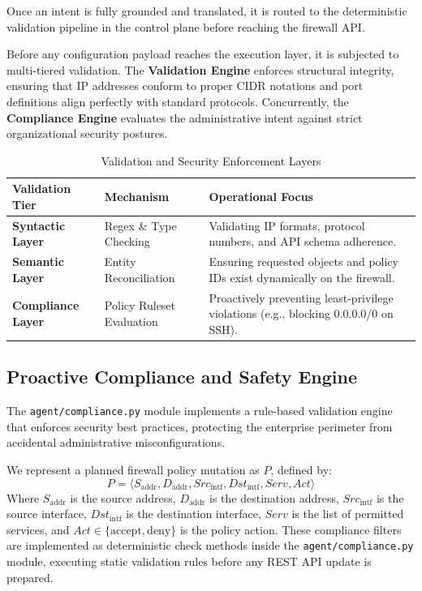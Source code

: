 Once an intent is fully grounded and translated, it is routed to the deterministic validation pipeline in the control plane before reaching the firewall API.

Before any configuration payload reaches the execution layer, it is subjected to multi-tiered validation. The \textbf{Validation Engine} enforces structural integrity, ensuring that IP addresses conform to proper CIDR notations and port definitions align perfectly with standard protocols. Concurrently, the \textbf{Compliance Engine} evaluates the administrative intent against strict organizational security postures.

\begin{table}[H]
    \centering
    \caption{Validation and Security Enforcement Layers}
    \label{tab:validation_stages}
    \renewcommand{\arraystretch}{1.2}
    \small
    \begin{tabular}{|l|l|p{6.5cm}|}
        \hline
        \textbf{Validation Tier} & \textbf{Mechanism} & \textbf{Operational Focus} \\
        \hline
        \textbf{Syntactic Layer} & Regex \& Type Checking & Validating IP formats, protocol numbers, and API schema adherence. \\
        \hline
        \textbf{Semantic Layer} & Entity Reconciliation & Ensuring requested objects and policy IDs exist dynamically on the firewall. \\
        \hline
        \textbf{Compliance Layer} & Policy Ruleset Evaluation & Proactively preventing least-privilege violations (e.g., blocking 0.0.0.0/0 on SSH). \\
        \hline
    \end{tabular}
\end{table}


\subsection{Proactive Compliance and Safety Engine}
The \texttt{agent/compliance.py} module implements a rule-based validation engine that enforces security best practices, protecting the enterprise perimeter from accidental administrative misconfigurations. 

We represent a planned firewall policy mutation as $P$, defined by:
\begin{equation}
    P = \langle S_{\text{addr}}, D_{\text{addr}}, Src_{\text{intf}}, Dst_{\text{intf}}, Serv, Act \rangle
\end{equation}
Where $S_{\text{addr}}$ is the source address, $D_{\text{addr}}$ is the destination address, $Src_{\text{intf}}$ is the source interface, $Dst_{\text{intf}}$ is the destination interface, $Serv$ is the list of permitted services, and $Act \in \{\text{accept}, \text{deny}\}$ is the policy action. These compliance filters are implemented as deterministic check methods inside the \texttt{agent/compliance.py} module, executing static validation rules before any REST API update is prepared.

